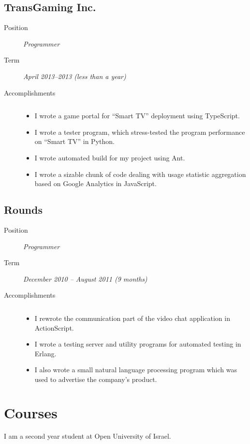 \documentclass[11pt]{article}
\begin{document}
\subsection{TransGaming Inc.}
\label{sec:orgheadline10}
\begin{description}
\item[{Position}] \emph{Programmer}
\item[{Term}] \emph{April 2013--2013 (less than a year)}
\item[{Accomplishments}] \(\;\)

\begin{itemize}
\item I wrote a game portal for ``Smart TV'' deployment using TypeScript.
\item I wrote a tester program, which stress-tested the program performance
on ``Smart TV'' in Python.
\item I wrote automated build for my project using Ant.
\item I wrote a sizable chunk of code dealing with usage statistic aggregation
based on Google Analytics in JavaScript.
\end{itemize}
\end{description}

\subsection{Rounds}
\label{sec:orgheadline11}
\begin{description}
\item[{Position}] \emph{Programmer}
\item[{Term}] \emph{December 2010 – August 2011 (9 months)}
\item[{Accomplishments}] \(\;\)

\begin{itemize}
\item I rewrote the communication part of the video chat application in
ActionScript.
\item I wrote a testing server and utility programs for automated testing in
Erlang.
\item I also wrote a small natural language processing program which was used
to advertise the company's product.
\end{itemize}
\end{description}

\section{Courses}
\label{sec:orgheadline13}
I am a second year student at Open University of Israel.
\end{document}

